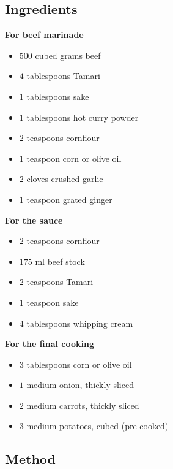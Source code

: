 \documentclass[11pt,a4paper]{article}
\begin{document}
\subsection*{Ingredients}

\begin{multicols}{2}

\textbf{For beef marinade}

\begin{itemize}
  \item $ 500 $ cubed grams beef
  \item $ 4 $ tablespoons \href{https://en.wikipedia.org/wiki/Tamari}{Tamari}
  \item $ 1 $ tablespoons sake
  \item $ 1 $ tablespoons hot curry powder
  \item $ 2 $ teaspoons cornflour
  \item $ 1 $ teaspoon corn or olive oil
  \item $ 2 $ cloves crushed garlic
  \item $ 1 $ teaspoon grated ginger
\end{itemize}

\columnbreak

\textbf{For the sauce}

\begin{itemize}
  \item $ 2 $ teaspoons cornflour
  \item $ 175 $ ml beef stock
  \item $ 2 $ teaspoons \href{https://en.wikipedia.org/wiki/Tamari}{Tamari}
  \item $ 1 $ teaspoon sake
  \item $ 4 $ tablespoons whipping cream
\end{itemize}

\textbf{For the final cooking}

\begin{itemize}
  \item $ 3 $ tablespoons corn or olive oil
  \item $ 1 $ medium onion, thickly sliced
  \item $ 2 $ medium carrots, thickly sliced
  \item $ 3 $ medium potatoes, cubed (pre-cooked)
\end{itemize}

\end{multicols}

\medskip

\subsection*{Method}
\end{document}
